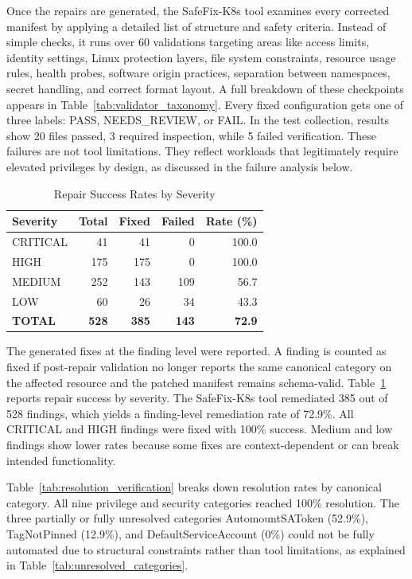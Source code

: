 \documentclass[preprint,12pt]{elsarticle}
\newcommand{\new}[1]{#1}
\begin{document}
Once the repairs are generated, the SafeFix-K8s tool examines every corrected manifest by applying a detailed list of structure and safety criteria. Instead of simple checks, it runs over 60 validations targeting areas like access limits, identity settings, Linux protection layers, file system constraints, resource usage rules, health probes, software origin practices, separation between namespaces, secret handling, and correct format layout. A full breakdown of these checkpoints appears in Table~\ref{tab:validator_taxonomy}. Every fixed configuration gets one of three labels: PASS, NEEDS\_REVIEW, or FAIL. In the test collection, results show 20 files passed, 3 required inspection, while 5 failed verification. \new{These failures are not tool limitations. They reflect workloads that legitimately require elevated privileges by design, as discussed in the failure analysis below.}
\begin{table}[]
\centering
\caption{Repair Success Rates by Severity}
\label{tab:repair_by_severity}
\small
\setlength{\tabcolsep}{5pt}
\renewcommand{\arraystretch}{1.1}
\begin{tabular}{lrrrr}
\hline
\textbf{Severity} & \textbf{Total} & \textbf{Fixed} & \textbf{Failed} & \textbf{Rate (\%)} \\
\hline
CRITICAL & 41 & 41 & 0 & 100.0 \\
HIGH & 175 & 175 & 0 & 100.0 \\
MEDIUM & 252 & 143 & 109 & 56.7 \\
LOW & 60 & 26 & 34 & 43.3 \\
\hline
\textbf{TOTAL} & \textbf{528} & \textbf{385} & \textbf{143} & \textbf{72.9} \\
\hline
\end{tabular}
\end{table}

The generated fixes at the finding level were reported. A finding is counted as fixed if post-repair validation no longer reports the same canonical category on the affected resource and the patched manifest remains schema-valid. Table~\ref{tab:repair_by_severity} reports repair success by severity. The SafeFix-K8s tool remediated 385 out of 528 findings, which yields a finding-level remediation rate of 72.9\%. All CRITICAL and HIGH findings were fixed with 100\% success. Medium and low findings show lower rates because some fixes are context-dependent or can break intended functionality.


\new{Table~\ref{tab:resolution_verification} breaks down resolution rates by canonical category. All nine privilege and security categories reached 100\% resolution. The three partially or fully unresolved categories AutomountSAToken (52.9\%), TagNotPinned (12.9\%), and DefaultServiceAccount (0\%) could not be fully automated due to structural constraints rather than tool limitations, as explained in Table~\ref{tab:unresolved_categories}.}
\end{document}
